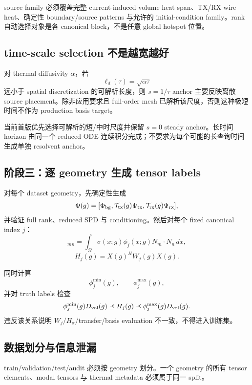 source family 必须覆盖完整 current-induced volume heat span、TX/RX wire heat、确定性 boundary/source patterns 与允许的 initial-condition family。rank 自动选择对象是各 canonical block，不是任意 global hotspot 位置。

\subsection{time-scale selection 不是越宽越好}
对 thermal diffusivity $\alpha$，若
\begin{equation}
\ell_d(\tau)=\sqrt{\alpha\tau}
\end{equation}
远小于 spatial discretization 的可解析长度，则 $s=1/\tau$ anchor 主要反映离散 source placement。除非应用要求且 full-order mesh 已解析该尺度，否则这种极短时间不作为 production basis target。

当前首版优先选择可解析的短/中时尺度并保留 $s=0$ steady anchor。长时间 horizon 由同一个 reduced ODE 连续积分完成；不要求为每个可能的长查询时间生成单独 resolvent anchor。

\subsection{阶段三：逐 geometry 生成 tensor labels}
对每个 dataset geometry，先确定性生成
\begin{equation}
\Phi(g)=
[\Phi_{\rm bg},\mathcal T_{\rm tx}(g)\Psi_{\rm tx},\mathcal T_{\rm rx}(g)\Psi_{\rm rx}],
\end{equation}
并验证 full rank、reduced SPD 与 conditioning。然后对每个 fixed canonical index $j$：
\begin{equation}
[W_j(g)]_{mn}
=\int_\Omega\sigma(x;g)\phi_j(x;g)N_m\cdot N_n\,dx,
\end{equation}
\begin{equation}
\boxed{H_j(g)=X(g)^HW_j(g)X(g).}
\end{equation}

同时计算
\begin{equation}
\phi_j^{\min}(g),\qquad\phi_j^{\max}(g),
\end{equation}
并对 truth labels 检查
\begin{equation}
\phi_j^{\min}(g)D_{\rm vol}(g)
\preceq H_j(g)
\preceq\phi_j^{\max}(g)D_{\rm vol}(g).
\end{equation}
违反该关系说明 $W_j/H_\sigma$/transfer/basis evaluation 不一致，不得进入训练集。

\subsection{数据划分与信息泄漏}
train/validation/test/audit 必须按 geometry 划分。一个 geometry 的所有 tensor elements、modal tensors 与 thermal metadata 必须属于同一 split。

